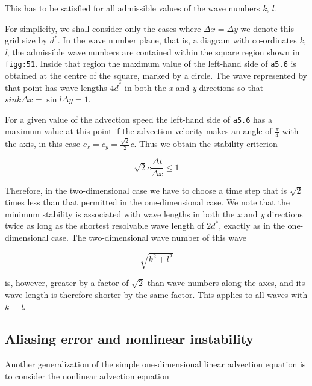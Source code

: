 This has to be satisfied for all admissible values of the wave numbers
\emph{k}, \emph{l}.

For simplicity, we shall consider only the cases where
\(\Delta x = \Delta y\) we denote this grid size by \(d^{*}\). In the
wave number plane, that is, a diagram with co-ordinates \emph{k, l}, the
admissible wave numbers are contained within the square region shown in
\texttt{figg:51}. Inside that region the maximum value of the left-hand
side of \texttt{a5.6} is obtained at the centre of the square, marked by
a circle. The wave represented by that point has wave lengths \(4d^*\)
in both the \emph{x} and \emph{y} directions so that
\(sink{\Delta x} = \sin{l\Delta y} = 1\).

\begin{figure}
\centering
{}
\caption{}
\end{figure}

For a given value of the advection speed the left-hand side of
\texttt{a5.6} has a maximum value at this point if the advection
velocity makes an angle of \(\frac{\pi}{4}\) with the axis, in this case
\(c_{x} = c_{y} = \frac{\sqrt{2}}{2}c\). Thus we obtain the stability
criterion

{\[\sqrt{2}c\frac{\Delta t}{\Delta x} \leq 1\]}

Therefore, in the two-dimensional case we have to choose a time step
that is \(\sqrt{2}\) times less than that permitted in the
one-dimensional case. We note that the minimum stability is associated
with wave lengths in both the \emph{x} and \emph{y} directions twice as
long as the shortest resolvable wave length of \({2d}^{*}\), exactly as
in the one-dimensional case. The two-dimensional wave number of this
wave

\[\sqrt{k^{2} + l^{2}}\]

is, however, greater by a factor of \(\sqrt{2}\) than wave numbers along
the axes, and its wave length is therefore shorter by the same factor.
This applies to all waves with \emph{k} = \emph{l}.

\subsection{\texorpdfstring{\textbf{Aliasing error and nonlinear
instability}}{Aliasing error and nonlinear instability}}\label{aliasing-error-and-nonlinear-instability}

Another generalization of the simple one-dimensional linear advection
equation is to consider the nonlinear advection equation

